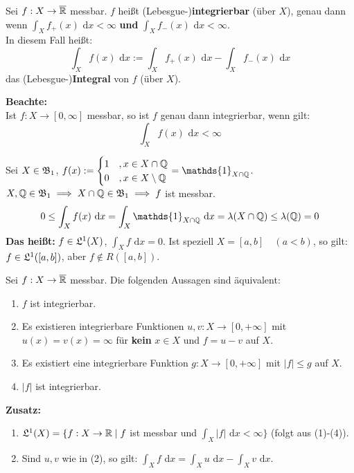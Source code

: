 \documentclass[a4paper,twoside,DIV15,BCOR12mm,chapterprefix=true,headings=onelinechapter]{scrbook}
\begin{document}
\begin{definition}
Sei $f:X\to\overline{\mathbb{R}}$ messbar. $f$ heißt (Lebesgue-)\textbf{integrierbar} (über $X$), genau dann wenn $\int_X f_+(x) \text{ d}x<\infty$ \textbf{und} $\int_X f_-(x) \text{ d}x<\infty$.\\
In diesem Fall heißt:
\[\int_X f(x) \text{ d}x:=\int_X f_+(x) \text{ d}x-\int_X f_-(x) \text{ d}x\]
das (Lebesgue-)\textbf{Integral} von $f$ (über $X$).
\end{definition}

\textbf{Beachte:}\\
Ist $f:X\to[0,\infty]$ messbar, so ist $f$ genau dann integrierbar, wenn gilt:
\[\int_X f(x) \text{ d}x<\infty\]

\begin{beispiel}
Sei $X \in \mathfrak{B}_1$, $f(x) := \begin{cases} 1&,x\in X\cap\MdQ\\ 0&,x\in X\setminus\MdQ\end{cases} = \mathds{1}_{X\cap\MdQ}$.
$X, \mathbb{Q} \in \mathfrak{B}_1 \implies X \cap \mathbb{Q} \in \mathfrak{B}_1 \implies f$ ist messbar.
\[0 \leq \int_X f(x) \text{ d}x = \int_X \mathds{1}_{X\cap\MdQ} \text{ d}x = \lambda(X\cap\MdQ) \leq \lambda(\MdQ) = 0\]
\textbf{Das heißt:} $f \in \mathfrak{L}^1(X)$, $\int_X f \text{ d}x = 0$.
Ist speziell $X = [a,b]\quad (a<b)$, so gilt: $f \in \mathfrak{L}^1([a,b])$, aber $f \not\in R([a,b])$. 
\end{beispiel}

\begin{satz}
\label{Satz 4.9}
Sei $f: X \to \overline{\mathbb{R}}$ messbar. Die folgenden Aussagen sind äquivalent:
\begin{enumerate}
 \item $f$ ist integrierbar.
 \item Es existieren integrierbare Funktionen $u, v: X \to [0,+\infty]$ mit $u(x)=v(x)=\infty$ für \textbf{kein} $x \in X$ und $f=u-v$ auf $X$.
 \item Es existiert eine integrierbare Funktion $g: X \to [0,+\infty]$ mit $\lvert f \rvert \leq g$ auf $X$.
 \item $\lvert f \rvert$ ist integrierbar.
\end{enumerate}
\end{satz}

\textbf{Zusatz:}
\begin{enumerate}
 \item $\mathfrak{L}^1(X) = \{f: X \to \mathbb{R} \mid f$ ist messbar und $\int_X \lvert f \rvert \text{ d}x < \infty\}$ (folgt aus (1)-(4)).
 \item Sind $u,v$ wie in (2), so gilt: $ \int_X f \text{ d}x = \int_X u \text{ d}x - \int_X v \text{ d}x$.
\end{enumerate}
\end{document}
